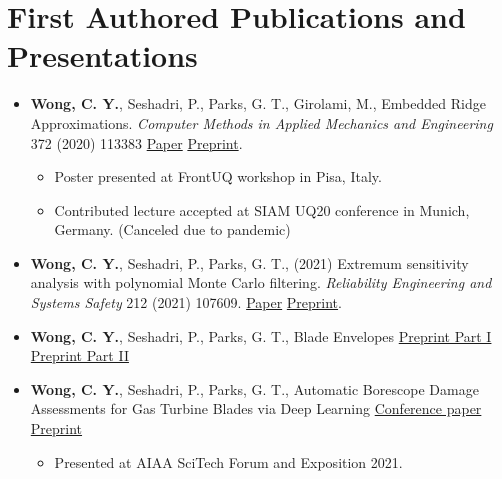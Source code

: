 \documentclass[letterpaper,11pt,oneside]{article}
\begin{document}
\section*{First Authored Publications and Presentations}
\begin{itemize}
\item \textbf{Wong, C. Y.}, Seshadri, P., Parks, G. T., Girolami, M., Embedded Ridge Approximations. \emph{Computer Methods in Applied Mechanics and Engineering} 372 (2020) 113383 \href{https://doi.org/10.1016/j.cma.2020.113383}{Paper}  \href{https://arxiv.org/abs/1907.07037}{Preprint}. 
\begin{itemize}
\item Poster presented at FrontUQ workshop in Pisa, Italy. 
\item Contributed lecture accepted at SIAM UQ20 conference in Munich, Germany. (Canceled due to pandemic)
\end{itemize}

\item \textbf{Wong, C. Y.}, Seshadri, P., Parks, G. T., (2021) Extremum sensitivity analysis with polynomial Monte Carlo filtering. \emph{Reliability Engineering and Systems Safety} 212 (2021) 107609. \href{https://doi.org/10.1016/j.ress.2021.107609}{Paper} \href{https://arxiv.org/abs/1907.08113}{Preprint}.

\item \textbf{Wong, C. Y.}, Seshadri, P., Parks, G. T., Blade Envelopes \href{https://arxiv.org/abs/2011.11636}{Preprint Part I} \href{https://arxiv.org/abs/2012.15579}{Preprint Part II}

\item  \textbf{Wong, C. Y.}, Seshadri, P., Parks, G. T., Automatic Borescope Damage Assessments for Gas Turbine Blades via Deep Learning \href{https://doi.org/10.2514/6.2021-1488}{Conference paper} \href{https://arxiv.org/abs/2103.05430}{Preprint} 
\begin{itemize}
\item Presented at AIAA SciTech Forum and Exposition 2021.
\end{itemize}

\end{itemize}
\end{document}
